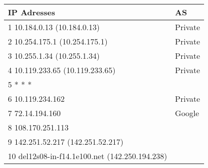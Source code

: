 \documentclass{article}
\begin{document}
\begin{table}[!ht]
    \centering
\begin{tabular}{|l|l|}
\hline
\textbf{IP Adresses}                                                        & \textbf{AS}                                                           \\ \hline
1  10.184.0.13 (10.184.0.13)                                                & Private                                                               \\ \hline
2  10.254.175.1 (10.254.175.1)                                              & Private                                                               \\ \hline
3  10.255.1.34 (10.255.1.34)                                                & Private                                                               \\ \hline
4  10.119.233.65 (10.119.233.65)                                            & Private                                                               \\ \hline
5  * * *                                                                    &                                                                       \\ \hline
6  10.119.234.162                                                           & Private                                                               \\ \hline
7  72.14.194.160                                                            & Google                                                                \\ \hline
8  108.170.251.113                                                          & \cellcolor[HTML]{F6F6F6}{\color[HTML]{5D5D5D} Google}                 \\ \hline
9  142.251.52.217 (142.251.52.217)                                          & \cellcolor[HTML]{F6F6F6}{\color[HTML]{5D5D5D} Google}                 \\ \hline
10  del12s08-in-f14.1e100.net (142.250.194.238)                             & \cellcolor[HTML]{F6F6F6}{\color[HTML]{5D5D5D} Google}  \\ \hline
\end{tabular}
\end{table}
\clearpage


\clearpage

\end{document}
